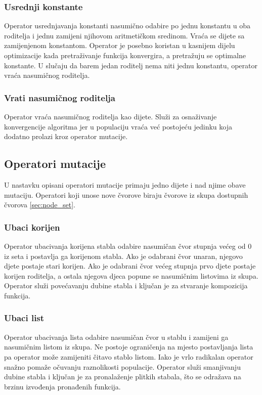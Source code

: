 \documentclass[times, utf8, numeric, diplomski]{fer}
\begin{document}
\subsubsection{Usrednji konstante}
Operator usrednjavanja konstanti nasumično odabire po jednu konstantu u oba roditelja i jednu zamijeni njihovom aritmetičkom sredinom. Vraća se dijete sa zamijenjenom konstantom. Operator je posebno koristan u kasnijem dijelu optimizacije kada pretraživanje funkcija konvergira, a pretražuju se optimalne konstante. U slučaju da barem jedan roditelj nema niti jednu konstantu, operator vraća nasumičnog roditelja.

\subsubsection{Vrati nasumičnog roditelja}
Operator vraća nasumičnog roditelja kao dijete. Služi za osnaživanje konvergencije algoritma jer u populaciju vraća već postojeću jedinku koja dodatno prolazi kroz operator mutacije.


\subsection{Operatori mutacije}
U nastavku opisani operatori mutacije primaju jedno dijete i nad njime obave mutaciju. Operatori koji unose nove čvorove biraju čvorove iz skupa dostupnih čvorova \ref{sec:node_set}.

\subsubsection{Ubaci korijen}
Operator ubacivanja korijena stabla odabire nasumičan čvor stupnja većeg od 0 iz seta i postavlja ga korijenom stabla. Ako je odabrani čvor unaran, njegovo djete postaje stari korijen. Ako je odabrani čvor većeg stupnja prvo djete postaje korijen roditelja, a ostala njegova djeca popune se nasumičnim listovima iz skupa. Operator služi povećavanju dubine stabla i ključan je za stvaranje kompozicija funkcija.

\subsubsection{Ubaci list}
Operator ubacivanja lista odabire nasumičan čvor u stablu i zamijeni ga nasumičnim listom iz skupa. Ne postoje ograničenja na mjesto postavljanja lista pa operator može zamijeniti čitavo stablo listom. Iako je vrlo radikalan operator snažno pomaže očuvanju raznolikosti populacije. Operator služi smanjivanju dubine stabla i ključan je za pronalaženje plitkih stabala, što se odražava na brzinu izvođenja pronađenih funkcija.
\end{document}
